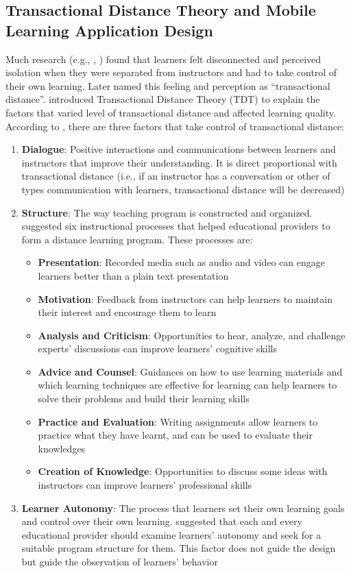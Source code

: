 \documentclass[a4paper,twoside]{article}
\begin{document}
\subsection{Transactional Distance Theory and Mobile Learning Application Design}
\noindent Much research (e.g., \citet{shearer2007instructional}, \citet{park2011pedagogical}) found that learners felt disconnected and perceived isolation when they were separated from instructors and had to take control of their own learning. Later \citet{moore19932} named this feeling and perception as ``transactional distance''. \citet{moore1973toward} introduced Transactional Distance Theory (TDT) to explain the factors that varied level of transactional distance and affected learning quality. According to \citet{moore1973toward}, there are three factors that take control of transactional distance: 
\begin{enumerate}
\item{\textbf{Dialogue}: Positive interactions and communications between learners and instructors that improve their understanding. It is direct proportional with transactional distance (i.e., if an instructor has a conversation or other of types communication with learners, transactional distance will be decreased)} 
\item{\textbf{Structure}: The way teaching program is constructed and organized. \citet{moore1973toward} suggested six instructional processes that helped educational providers to form a distance learning program. These processes are:
\begin{itemize}
\item {\textbf{Presentation}: Recorded media such as audio and video can engage learners better than a plain text presentation}
\item {\textbf{Motivation}: Feedback from instructors can help learners to maintain their interest and encourage them to learn} 
\item {\textbf{Analysis and Criticism}: Opportunities to hear, analyze, and challenge experts' discussions can improve learners' cognitive skills}
\item {\textbf{Advice and Counsel}: Guidances on how to use learning materials and which learning techniques are effective for learning can help learners to solve their problems and build their learning skills}
\item {\textbf{Practice and Evaluation}: Writing assignments allow learners to practice what they have learnt, and can be used to evaluate their knowledges}
\item {\textbf{Creation of Knowledge}: Opportunities to discuss some ideas with instructors can improve learners' professional skills}
\end{itemize} 
}
\item{\textbf{Learner Autonomy}: The process that learners set their own learning goals and control over their own learning. \citet{moore1980independent} suggested that each and every educational provider should examine learners' autonomy and seek for a suitable program structure for them. This factor does not guide the design but guide the observation of learners' behavior}
\end{enumerate}
\end{document}
